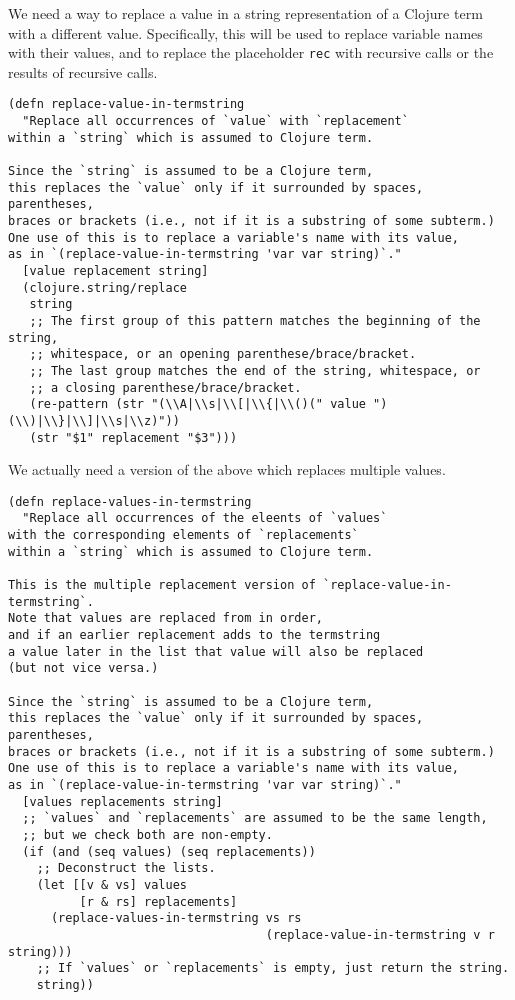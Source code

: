 \documentclass[11pt]{article}
\begin{document}
We need a way to replace a value in a string representation
of a Clojure term with a different value.
Specifically, this will be used to replace variable names with their values,
and to replace the placeholder \texttt{rec} with recursive calls
or the results of recursive calls.
\begin{verbatim}
(defn replace-value-in-termstring
  "Replace all occurrences of `value` with `replacement`
within a `string` which is assumed to Clojure term.

Since the `string` is assumed to be a Clojure term,
this replaces the `value` only if it surrounded by spaces, parentheses,
braces or brackets (i.e., not if it is a substring of some subterm.)
One use of this is to replace a variable's name with its value,
as in `(replace-value-in-termstring 'var var string)`."
  [value replacement string]
  (clojure.string/replace
   string
   ;; The first group of this pattern matches the beginning of the string,
   ;; whitespace, or an opening parenthese/brace/bracket.
   ;; The last group matches the end of the string, whitespace, or
   ;; a closing parenthese/brace/bracket.
   (re-pattern (str "(\\A|\\s|\\[|\\{|\\()(" value ")(\\)|\\}|\\]|\\s|\\z)"))
   (str "$1" replacement "$3")))
\end{verbatim}

We actually need a version of the above which replaces multiple values.
\begin{verbatim}
(defn replace-values-in-termstring
  "Replace all occurrences of the eleents of `values`
with the corresponding elements of `replacements`
within a `string` which is assumed to Clojure term.

This is the multiple replacement version of `replace-value-in-termstring`.
Note that values are replaced from in order,
and if an earlier replacement adds to the termstring
a value later in the list that value will also be replaced
(but not vice versa.)

Since the `string` is assumed to be a Clojure term,
this replaces the `value` only if it surrounded by spaces, parentheses,
braces or brackets (i.e., not if it is a substring of some subterm.)
One use of this is to replace a variable's name with its value,
as in `(replace-value-in-termstring 'var var string)`."
  [values replacements string]
  ;; `values` and `replacements` are assumed to be the same length,
  ;; but we check both are non-empty.
  (if (and (seq values) (seq replacements))
    ;; Deconstruct the lists.
    (let [[v & vs] values
          [r & rs] replacements]
      (replace-values-in-termstring vs rs
                                    (replace-value-in-termstring v r string)))
    ;; If `values` or `replacements` is empty, just return the string.
    string))
\end{verbatim}
\end{document}
